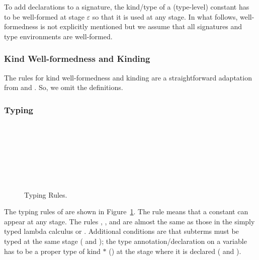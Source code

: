 To add declarations to a signature, the kind/type of a (type-level)
constant has to be well-formed at stage \(\varepsilon\) so that it is
used at any stage.  In what follows, well-formedness is not explicitly
mentioned but we assume that all signatures and type environments are
well-formed.

\subsubsection{Kind Well-formedness and Kinding}

The rules for kind well-formedness and kinding are a straightforward adaptation
from \LLF and \LTP. So, we omit the definitions.

\subsubsection{Typing}
\label{sec:typing}

\begin{figure}[tbp]
  \begin{center}
     \hfil
     \\[2mm]
     \\[2mm]
     \\[2mm]
     \\[2mm]
     \andalso
     \\[2mm]
     \\[2mm]
     \andalso
    \caption{Typing Rules.}
    \label{fig:typing-rules}
  \end{center}
\end{figure}

The typing rules of \LMD are shown in Figure~\ref{fig:typing-rules}.
The rule \TConst{} means that a constant can appear at any stage.
The rules \TVar, \TAbs, and \TApp{} are almost the same as those in the simply typed
lambda calculus or \LLF.  Additional conditions are that subterms must be
typed at the same stage (\TAbs{} and \TApp); the type
annotation/declaration on a variable has to be a proper type of kind
$*$ (\TAbs) at the stage where it is declared (\TVar{} and \TAbs).

